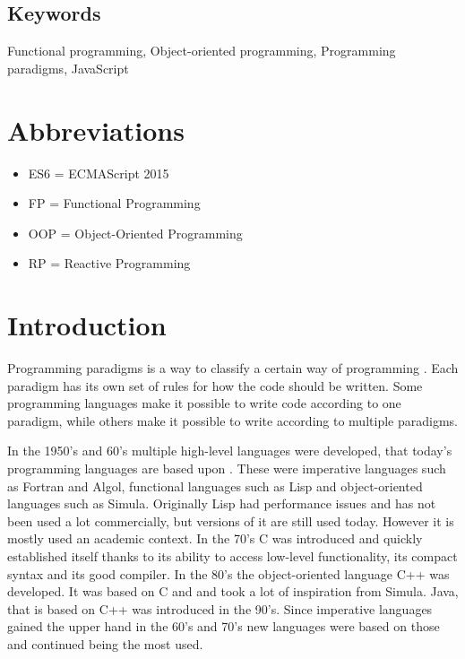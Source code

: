 \documentclass {article}
\begin{document}
\subsection*{Keywords}
Functional programming, Object-oriented programming, Programming paradigms, JavaScript

\newpage
\tableofcontents
\newpage
{}
\newpage
\listoffigures
\newpage
\listoftables
\newpage
\section*{Abbreviations}
\begin{itemize}[leftmargin=*]
\item [ ] ES6 = ECMAScript 2015
\item [ ] FP = Functional Programming
\item [ ] OOP = Object-Oriented Programming
\item [ ] RP = Reactive Programming
\end{itemize}

\newpage
\section{Introduction}
Programming paradigms is a way to classify a certain way of programming \cite{programming-paradigms}. Each paradigm has its own set of rules for how the code should be written. Some programming languages make it possible to write code according to one paradigm,  while others make it possible to write according to multiple paradigms. 

In the 1950's and 60's multiple high-level languages were developed, that today's programming languages are based upon \cite{gabmar}. These were imperative languages such as Fortran and Algol, functional languages such as Lisp and object-oriented languages such as Simula. Originally Lisp had performance issues and has not been used a lot commercially, but versions of it are still used today. However it is mostly used an academic context. In the 70's C was introduced and quickly established itself thanks to its ability to access low-level functionality, its compact syntax and its good compiler. In the 80's the object-oriented language C++ was developed. It was based on C and and took a lot of inspiration from Simula. Java, that is based on C++ was introduced in the 90's. Since imperative languages gained the upper hand in the 60's and 70's new languages were based on those and continued being the most used. 
\end{document}
